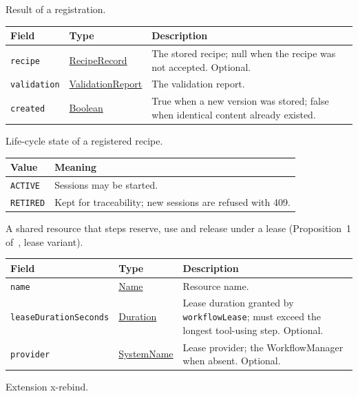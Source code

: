 \documentclass[a4paper]{arrowhead}
\newcommand{\mref}[1]{{\textcolor{ArrowheadPurple}{\hyperref[sec:model:#1]{#1}}}}
\newcommand{\pref}[1]{{\textcolor{ArrowheadGrey}{\hyperref[sec:model:primitives:#1]{#1}}}}
\begin{document}
Result of a registration.

{\small
\begin{longtable}{|p{3.9cm}|p{4.4cm}|p{7.5cm}|}

\hline
\rowcolor{gray!33} Field & Type & Description \\ \hline
\endhead
\texttt{recipe} & \mref{RecipeRecord} & The stored recipe; null when the recipe was not accepted. Optional. \\ \hline
\texttt{validation} & \mref{ValidationReport} & The validation report. \\ \hline
\texttt{created} & \pref{Boolean} & True when a new version was stored; false when identical content already existed. \\ \hline
\end{longtable}
}

Life-cycle state of a registered recipe.

{\small
\begin{longtable}{|p{3.9cm}|p{11.9cm}|}

\hline
\rowcolor{gray!33} Value & Meaning \\ \hline
\endhead
\texttt{ACTIVE} & Sessions may be started. \\ \hline
\texttt{RETIRED} & Kept for traceability; new sessions are refused with 409. \\ \hline
\end{longtable}
}

A shared resource that steps reserve, use and release under a lease (Proposition~1 of~\cite{varga2026}, lease variant).

{\small
\begin{longtable}{|p{3.9cm}|p{4.4cm}|p{7.5cm}|}

\hline
\rowcolor{gray!33} Field & Type & Description \\ \hline
\endhead
\texttt{name} & \pref{Name} & Resource name. \\ \hline
\texttt{leaseDurationSeconds} & \pref{Duration} & Lease duration granted by \texttt{workflowLease}; must exceed the longest tool-using step. Optional. \\ \hline
\texttt{provider} & \pref{SystemName} & Lease provider; the WorkflowManager when absent. Optional. \\ \hline
\end{longtable}
}

Extension x-rebind.
\end{document}
